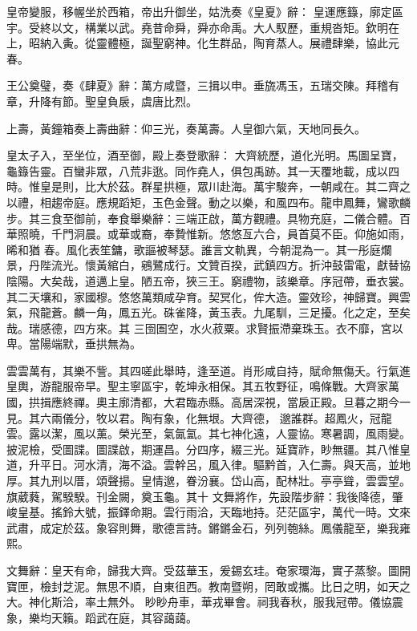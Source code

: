 \begin{pinyinscope}
 皇帝變服，移幄坐於西箱，帝出升御坐，姑洗奏《皇夏》辭：
 皇運應籙，廓定區宇。受終以文，構業以武。堯昔命舜，舜亦命禹。大人馭歷，重規沓矩。欽明在上，昭納入夤。從靈體極，誕聖窮神。化生群品，陶育蒸人。展禮肆樂，協此元春。



 王公奠璧，奏《肆夏》辭：萬方咸暨，三揖以申。垂旒馮玉，五瑞交陳。拜稽有章，升降有節。聖皇負扆，虞唐比烈。



 上壽，黃鐘箱奏上壽曲辭：仰三光，奏萬壽。人皇御六氣，天地同長久。



 皇太子入，至坐位，酒至御，殿上奏登歌辭：
 大齊統歷，道化光明。馬圖呈寶，龜籙告靈。百蠻非眾，八荒非逖。同作堯人，俱包禹跡。其一天覆地載，成以四時。惟皇是則，比大於茲。群星拱極，眾川赴海。萬宇駿奔，一朝咸在。其二齊之以禮，相趨帝庭。應規蹈矩，玉色金聲。動之以樂，和風四布。龍申鳳舞，鸞歌麟步。其三食至御前，奉食舉樂辭：三端正啟，萬方觀禮。具物充庭，二儀合體。百華照曉，千門洞晨。或華或裔，奉贄惟新。悠悠亙六合，員首莫不臣。仰施如雨，晞和猶
 春。風化表笙鏞，歌謳被琴瑟。誰言文軌異，今朝混為一。其一彤庭爛景，丹陛流光。懷黃綰白，鵷鷺成行。文贊百揆，武鎮四方。折沖鼓雷電，獻替協陰陽。大矣哉，道邁上皇。陋五帝，狹三王。窮禮物，該樂章。序冠帶，垂衣裳。其二天壤和，家國穆。悠悠萬類咸孕育。契冥化，侔大造。靈效珍，神歸寶。興雲氣，飛龍蒼。麟一角，鳳五光。硃雀降，黃玉表。九尾馴，三足擾。化之定，至矣哉。瑞感德，四方來。其
 三囹圄空，水火菽粟。求賢振滯棄珠玉。衣不靡，宮以卑。當陽端默，垂拱無為。



 雲雲萬有，其樂不訾。其四嗟此舉時，逢至道。肖形咸自持，賦命無傷夭。行氣進皇輿，游龍服帝早。聖主寧區宇，乾坤永相保。其五牧野征，鳴條戰。大齊家萬國，拱揖應終禪。奧主廓清都，大君臨赤縣。高居深視，當扆正殿。旦暮之期今一見。其六兩儀分，牧以君。陶有象，化無垠。大齊德，
 邈誰群。超鳳火，冠龍雲。露以潔，風以薰。榮光至，氣氤氳。其七神化遠，人靈協。寒暑調，風雨變。披泥檢，受圖諜。圖諜啟，期運昌。分四序，綴三光。延寶祚，眇無疆。其八惟皇道，升平日。河水清，海不溢。雲幹呂，風入律。驅黔首，入仁壽。與天高，並地厚。其九刑以厝，頌聲揚。皇情邈，眷汾襄。岱山高，配林壯。亭亭聳，雲雲望。旗葳蕤，駕騤騤。刊金闕，奠玉龜。其十
 文舞將作，先設階步辭：我後降德，肇峻皇基。搖鈴大號，振鐸命期。雲行雨洽，天臨地持。茫茫區宇，萬代一時。文來武肅，成定於茲。象容則舞，歌德言詩。鏘鏘金石，列列匏絲。鳳儀龍至，樂我雍熙。



 文舞辭：皇天有命，歸我大齊。受茲華玉，爰錫玄珪。奄家環海，實子蒸黎。圖開寶匣，檢封芝泥。無思不順，自東徂西。教南暨朔，罔敢或攜。比日之明，如天之大。神化斯洽，率土無外。
 眇眇舟車，華戎畢會。祠我春秋，服我冠帶。儀協震象，樂均天籟。蹈武在庭，其容藹藹。




\end{pinyinscope}
